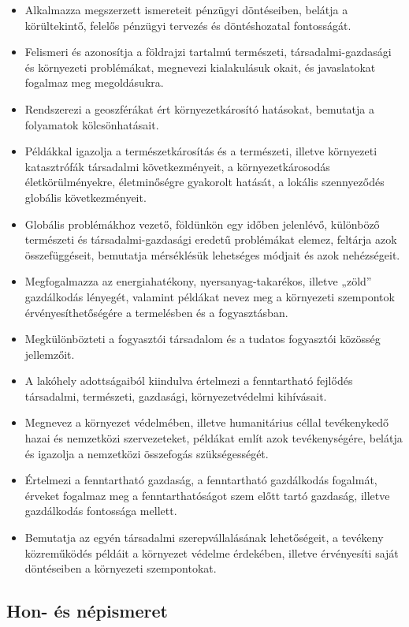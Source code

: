 \begin{itemize}
\item
  Alkalmazza megszerzett ismereteit pénzügyi döntéseiben, belátja a
  körültekintő, felelős pénzügyi tervezés és döntéshozatal fontosságát.
\item
  Felismeri és azonosítja a földrajzi tartalmú természeti,
  társadalmi-gazdasági és környezeti problémákat, megnevezi kialakulásuk
  okait, és javaslatokat fogalmaz meg megoldásukra.
\item
  Rendszerezi a geoszférákat ért környezetkárosító hatásokat, bemutatja
  a folyamatok kölcsönhatásait.
\item
  Példákkal igazolja a természetkárosítás és a természeti, illetve
  környezeti katasztrófák társadalmi következményeit, a
  környezetkárosodás életkörülményekre, életminőségre gyakorolt hatását,
  a lokális szennyeződés globális következményeit.
\item
  Globális problémákhoz vezető, földünkön egy időben jelenlévő,
  különböző természeti és társadalmi-gazdasági eredetű problémákat
  elemez, feltárja azok összefüggéseit, bemutatja mérséklésük lehetséges
  módjait és azok nehézségeit.
\item
  Megfogalmazza az energiahatékony, nyersanyag-takarékos, illetve „zöld''
  gazdálkodás lényegét, valamint példákat nevez meg a környezeti
  szempontok érvényesíthetőségére a termelésben és a fogyasztásban.
\item
  Megkülönbözteti a fogyasztói társadalom és a tudatos fogyasztói
  közösség jellemzőit.
\item
  A lakóhely adottságaiból kiindulva értelmezi a fenntartható fejlődés
  társadalmi, természeti, gazdasági, környezetvédelmi kihívásait.
\item
  Megnevez a környezet védelmében, illetve humanitárius céllal
  tevékenykedő hazai és nemzetközi szervezeteket, példákat említ azok
  tevékenységére, belátja és igazolja a nemzetközi összefogás
  szükségességét.
\item
  Értelmezi a fenntartható gazdaság, a fenntartható gazdálkodás
  fogalmát, érveket fogalmaz meg a fenntarthatóságot szem előtt tartó
  gazdaság, illetve gazdálkodás fontossága mellett.
\item
  Bemutatja az egyén társadalmi szerepvállalásának lehetőségeit, a
  tevékeny közreműködés példáit a környezet védelme érdekében, illetve
  érvényesíti saját döntéseiben a környezeti szempontokat.
\end{itemize}

\hypertarget{hon--es-nepismeret}{%
\subsection{Hon- és népismeret}\label{hon--es-nepismeret}}

